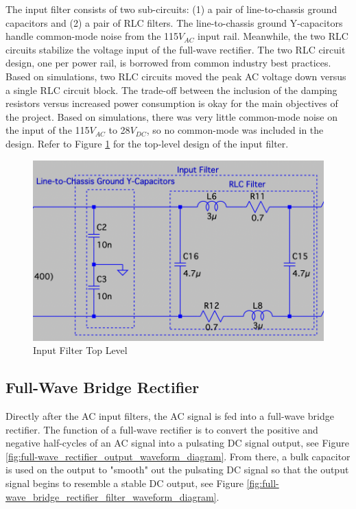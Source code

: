 \documentclass[conference]{IEEEtran}
\begin{document}
The input filter consists of two sub-circuits: (1) a pair of line-to-chassis ground capacitors and (2) a pair of RLC filters. The line-to-chassis ground Y-capacitors handle common-mode noise from the 115$V_{AC}$ input rail. Meanwhile, the two RLC circuits stabilize the voltage input of the full-wave rectifier. The two RLC circuit design, one per power rail, is borrowed from common industry best practices. Based on simulations, two RLC circuits moved the peak AC voltage down versus a single RLC circuit block. The trade-off between the inclusion of the damping resistors versus increased power consumption is okay for the main objectives of the project. Based on simulations, there was very little common-mode noise on the input of the 115$V_{AC}$ to 28$V_{DC}$, so no common-mode was included in the design. Refer to Figure \ref{fig:input_filter_top_level_diagram} for the top-level design of the input filter. 

\begin{figure}[htp]
    \centering
    \includegraphics[width=1.0\linewidth]{input_filter_top_level.png}
    \caption{Input Filter Top Level}
    \label{fig:input_filter_top_level_diagram}
\end{figure}

\subsection{Full-Wave Bridge Rectifier}
Directly after the AC input filters, the AC signal is fed into a full-wave bridge rectifier. The function of a full-wave rectifier is to convert the positive and negative half-cycles of an AC signal into a pulsating DC signal output, see Figure \ref{fig:full-wave_rectifier_output_waveform_diagram}. From there, a bulk capacitor is used on the output to "smooth" out the pulsating DC signal so that the output signal begins to resemble a stable DC output, see Figure \ref{fig:full-wave_bridge_rectifier_filter_waveform_diagram}. 
\end{document}
